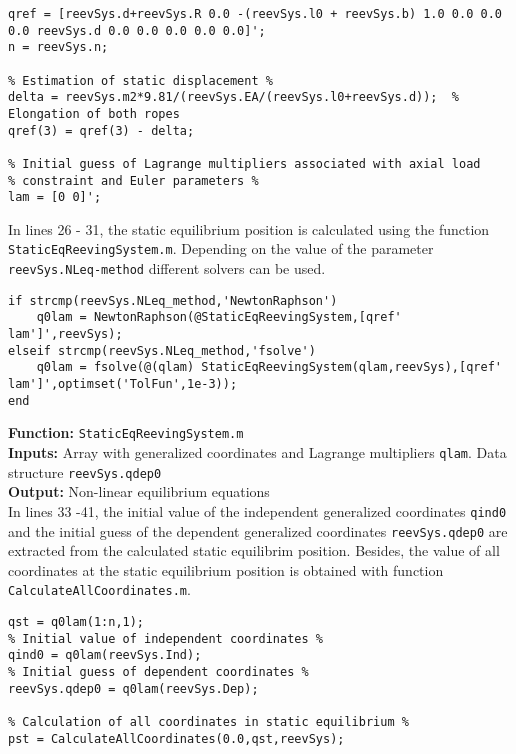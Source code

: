 {\begin{tcolorbox}\begin{lstlisting}[style=Matlab-editor]
% Reference value of coordinates (undeformed configuration) %
qref = [reevSys.d+reevSys.R 0.0 -(reevSys.l0 + reevSys.b) 1.0 0.0 0.0 0.0 reevSys.d 0.0 0.0 0.0 0.0 0.0]';
n = reevSys.n;

% Estimation of static displacement %
delta = reevSys.m2*9.81/(reevSys.EA/(reevSys.l0+reevSys.d));  % Elongation of both ropes
qref(3) = qref(3) - delta;  

% Initial guess of Lagrange multipliers associated with axial load
% constraint and Euler parameters %
lam = [0 0]';
\end{lstlisting}\end{tcolorbox}}


In lines 26 - 31, the static equilibrium position is calculated using the function \texttt{StaticEqReevingSystem.m}. Depending on the value of the parameter \texttt{reevSys.NLeq-method} different solvers can be used.

{\begin{tcolorbox}\begin{lstlisting}[style=Matlab-editor]
% Calculation of static equilibrium position %
if strcmp(reevSys.NLeq_method,'NewtonRaphson')
    q0lam = NewtonRaphson(@StaticEqReevingSystem,[qref' lam']',reevSys);
elseif strcmp(reevSys.NLeq_method,'fsolve')
    q0lam = fsolve(@(qlam) StaticEqReevingSystem(qlam,reevSys),[qref' lam']',optimset('TolFun',1e-3));
end
\end{lstlisting}\end{tcolorbox}}


\setlength{\parindent}{0cm}
\textbf{Function:} \texttt{StaticEqReevingSystem.m} \\
\textbf{Inputs:} Array with generalized coordinates and Lagrange multipliers \texttt{qlam}. Data structure \texttt{reevSys.qdep0} \\
\textbf{Output:} Non-linear equilibrium equations \\

In lines 33 -41, the initial value of the independent generalized coordinates \texttt{qind0} and the initial guess of the dependent generalized coordinates \texttt{reevSys.qdep0} are extracted from the calculated static equilibrim position. Besides, the value of all coordinates at the static equilibrium position is obtained with function \texttt{CalculateAllCoordinates.m}.

{\begin{tcolorbox}\begin{lstlisting}[style=Matlab-editor]
% Generalized coordinates in static equilibrium %
qst = q0lam(1:n,1);
% Initial value of independent coordinates %
qind0 = q0lam(reevSys.Ind);
% Initial guess of dependent coordinates %
reevSys.qdep0 = q0lam(reevSys.Dep);

% Calculation of all coordinates in static equilibrium %
pst = CalculateAllCoordinates(0.0,qst,reevSys);
\end{lstlisting}\end{tcolorbox}}


